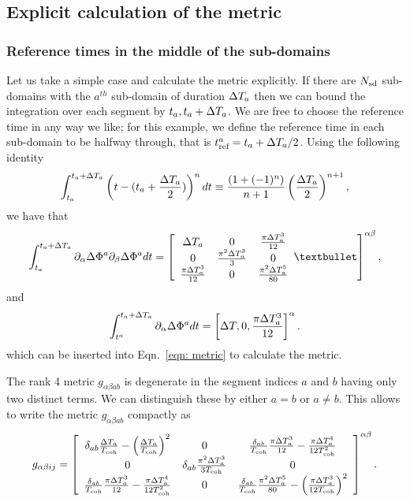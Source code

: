 \documentclass[../full_thesis/full_thesis.tex]{subfiles}
\begin{document}
\subsection{Explicit calculation of the metric}

\subsubsection{Reference times in the middle of the sub-domains}
Let us take a simple case and calculate the metric explicitly. If there are $N_{\textrm{sd}}$
sub-domains with the $a^{th}$ sub-domain of duration $\Delta T_a$ then we can bound the
integration over each segment by $t_{a}, t_{a} + \Delta T_a$. We are free to choose
the reference time
in any way we like; for this example, we define the reference time in each sub-domain
to be halfway through, that is $t_{\textrm{ref}}^{a} = t_{a} + \Delta T_a/2$. Using the following identity
\begin{align}
\int_{t_{a}}^{t_{a}+\Delta T_a} \left(t - (t_{a} + \frac{\Delta T_a}{2})\right)^{n}
dt \equiv  \frac{\left(1
+(-1)^{n}\right)}{n+1}\left(\frac{\Delta T_a}{2}\right)^{n+1},
\end{align}
we have that
\begin{equation}
\int_{t_{a}}^{t_{a}+\dT_a} \partial_{\alpha}\Delta \Phi^{a}  \partial_{\beta}\Delta \Phi^{a} dt =  \left[\begin{array}{ccc}
\dT_a  & 0 &  \frac{\pi \dT_a^{3}}{12}\\
0 & \frac{\pi^{2}\dT_a^{3}}{3} &  0\\
\frac{\pi \dT_a^{3}}{12} & 0  &  \frac{\pi^{2}\dT_a^{5}}{80}\\
\end{array}•
\right]^{\alpha\beta},
\end{equation}
and
\begin{equation}
\int_{t^{a}}^{t_{a}+\Delta T_a} \partial_{\alpha}\Delta \Phi^{a}  dt =
 \left[\Delta T, 0 , \frac{\pi \Delta T_a^{3}}{12} \right]^{\alpha}.
\end{equation}
which can be inserted into Eqn.~\eqref{eqn: metric} to calculate the metric.

The rank 4 metric $g_{\alpha\beta a b}$ is degenerate in the segment indices
$a$ and $b$ having only two distinct terms. We can distinguish these by either
$a=b$ or $a\ne b$. This allows to write the metric $g_{\alpha \beta a b}$
compactly as
\begin{align}
g_{\alpha\beta ij} = \left[\begin{array}{ccc}
\delta_{ab}\frac{\Delta T_a}{T_{\mathrm{coh}}} -\left(\frac{\Delta T_a}{T_{\mathrm{coh}}}\right)^{2}
& 0
& \frac{\delta_{ab}}{T_{\mathrm{coh}}}\frac{\pi \Delta T_a^{3}}{12} - \frac{\pi \Delta T_a^{4}}{12T_{\mathrm{coh}}^{2}}\\
0
& \delta_{ab}\frac{\pi^{2}\Delta T_a^{3}}{3T_{\mathrm{coh}}}
&  0\\
\frac{\delta_{ab}}{T_{\mathrm{coh}}}\frac{\pi \Delta T_a^{3}}{12} - \frac{\pi \Delta T_a^{4}}{12T_{\mathrm{coh}}^{2}}
& 0
&  \frac{\delta_{ab}}{T_{\mathrm{coh}}}\frac{\pi^{2}\Delta T_a^{5}}{80} -  \left(\frac{\pi \Delta T_a^{3}}{12 T_{\mathrm{coh}}}\right)^{2} \\
\end{array}
\right]^{\alpha\beta}.
\label{eqn: metric tref half}
\end{align}
\end{document}
